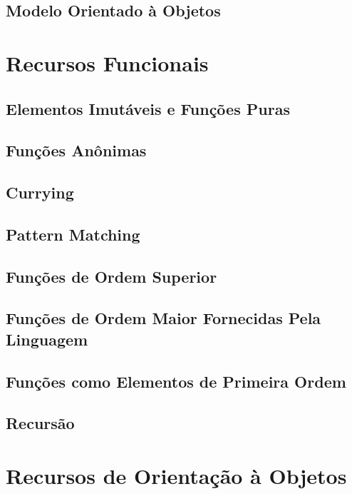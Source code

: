 \documentclass[rel_mlp]{iiufrgs}
\begin{document}
\section{Modelo Orientado à Objetos}





\chapter{Recursos Funcionais}

\section{Elementos Imutáveis e Funções Puras}

\section{Funções Anônimas}

\section{Currying}

\section{Pattern Matching}

\section{Funções de Ordem Superior}

\section{Funções de Ordem Maior Fornecidas Pela Linguagem}

\section{Funções como Elementos de Primeira Ordem}

\section{Recursão}


\chapter{Recursos de Orientação à Objetos}
\end{document}
